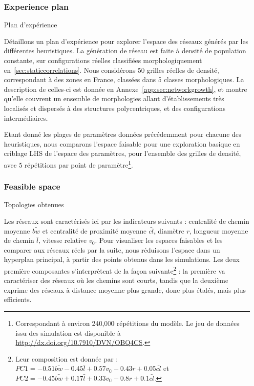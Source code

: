 \subsubsection{Experience plan}{Plan d'expérience}


Détaillons un plan d'expérience pour explorer l'espace des réseaux générés par les différentes heuristiques. La génération de réseau est faite à densité de population constante, sur configurations réelles classifiées morphologiquement en~\ref{sec:staticcorrelations}. Nous considérons 50 grilles réelles de densité, correspondant à des zones en France, classées dans 5 classes morphologiques. La description de celles-ci est donnée en Annexe~\ref{app:sec:networkgrowth}, et montre qu'elle couvrent un ensemble de morphologies allant d'établissements très localisés et dispersés à des structures polycentriques, et des configurations intermédiaires.


Etant donné les plages de paramètres données précédemment pour chacune des heuristiques, nous comparons l'espace faisable pour une exploration basique en criblage LHS de l'espace des paramètres, pour l'ensemble des grilles de densité, avec 5 répétitions par point de paramètre\footnote{Correspondant à environ 240,000 répétitions du modèle. Le jeu de données issu des simulation est disponible à \url{http://dx.doi.org/10.7910/DVN/OBQ4CS}.}.

\subsubsection{Feasible space}{Topologies obtenues}

Les réseaux sont caractérisés ici par les indicateurs suivants : centralité de chemin moyenne $\bar{bw}$ et centralité de proximité moyenne $\bar{cl}$, diamètre $r$, longueur moyenne de chemin $\bar{l}$, vitesse relative $v_0$. Pour visualiser les espaces faisables et les comparer aux réseaux réels par la suite, nous réduisons l'espace dans un hyperplan principal, à partir des points obtenus dans les simulations. Les deux première composantes s'interprètent de la façon suivante\footnote{Leur composition est donnée par : $PC1 = - 0.51 \bar{bw} - 0.45 \bar{l} + 0.57 v_0 - 0.43 r + 0.05 \bar{cl}$ et $PC2 = -0.45 \bar{bw} + 0.17 \bar{l} +0.33 v_0 + 0.8 r +0.1 \bar{cl}$.} : la première va caractériser des réseaux où les chemins sont courts, tandis que la deuxième exprime des réseaux à distance moyenne plus grande, donc plus étalés, mais plus efficients. 

